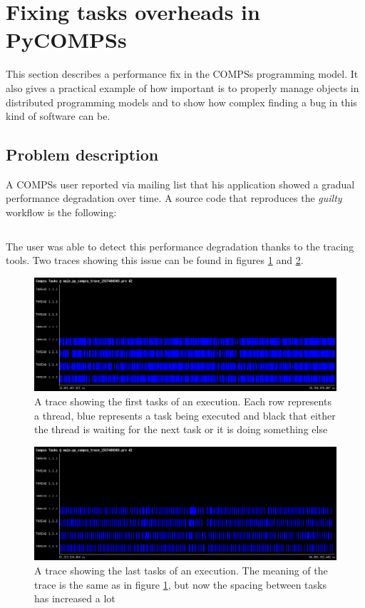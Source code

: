 \newpage
\section{Fixing tasks overheads in PyCOMPSs}
\label{sec:task_overhead}
This section describes a performance fix in the COMPSs programming model. It also gives a practical example of how important is to properly manage objects in distributed programming models and to show how complex finding a bug in this kind of software can be.

\subsection{Problem description}
A COMPSs user reported via mailing list that his application showed a gradual performance degradation over time. A source code that reproduces the \textit{guilty} workflow is the following:

\inputminted{python}{applications/TASK_OVERHEAD/main.py}

The user was able to detect this performance degradation thanks to the tracing tools. Two traces showing this issue can be found in figures \ref{fig:zoom_task_early} and \ref{fig:zoom_task_late}.

\begin{figure}
\centering
\includegraphics[scale = 0.3]{figures/zoom_task_early.png}
\caption{A trace showing the first tasks of an execution. Each row represents a thread, blue represents a task being executed and black that either the thread is waiting for the next task or it is doing something else}
\label{fig:zoom_task_early}
\end{figure}

\begin{figure}
\centering
\includegraphics[scale = 0.3]{figures/zoom_task_late.png}
\caption{A trace showing the last tasks of an execution. The meaning of the trace is the same as in figure \ref{fig:zoom_task_early}, but now the spacing between tasks has increased a lot}
\label{fig:zoom_task_late}
\end{figure}

